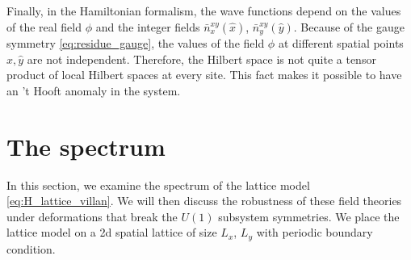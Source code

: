 \documentclass[12pt]{article}
\numberwithin{equation}{section}
\begin{document}
Finally, in the Hamiltonian formalism, the wave functions depend on the values of the real field $\phi$ and the integer fields $\bar n_{x}^{xy}(\hat x)$, $\bar n_{y}^{xy}(\hat y)$.
Because of the gauge symmetry \eqref{eq:residue_gauge}, the values of the field $\phi$ at different spatial points $\hat x,\hat y$ are not independent.
Therefore, the Hilbert space is not quite a tensor product of local Hilbert spaces at every site.  This fact makes it possible to have an 't Hooft anomaly in the system.


\section{The spectrum}\label{sec:spectrum}


In this section, we examine the spectrum of the lattice model \eqref{eq:H_lattice_villan}.
We will then discuss the robustness of these field theories under deformations that break the $U(1)$  subsystem symmetries.
We place the lattice model on a 2d spatial lattice of size $L_x$, $L_y$ with periodic boundary condition.
\end{document}
